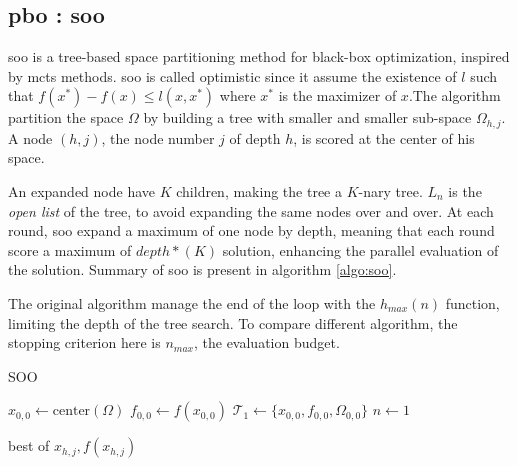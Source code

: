 \subsection{\acrlong{pbo} : \acrfull{soo}}
\label{sec:soo}

\acrshort{soo} \cite{munos_optimistic_2011} is a tree-based space partitioning method for black-box optimization, inspired by \acrfull{mcts} methods. \acrshort{soo} is called optimistic since it assume the existence of $ l$ such that $f(x^*)-f(x) \leq l(x,x^*)$ where $x^*$ is the maximizer of $x$.The algorithm partition the space $\Omega$ by building a tree with smaller and smaller sub-space $\Omega_{h,j}$. A node $(h,j)$, the node number $j$ of depth $h$, is scored at the center of his space. 
    
An expanded node have $K$ children, making the tree a $K$-nary tree. $L_n$ is the \textit{open list} of the tree, to avoid expanding the same nodes over and over. At each round, \acrshort{soo} expand a maximum of one node by depth, meaning that each round score a maximum of $depth*(K)$ solution, enhancing the parallel evaluation of the solution. Summary of \acrshort{soo} is present in algorithm \ref{algo:soo}.

The original algorithm manage the end of the loop with the $h_{max}(n)$ function, limiting the depth of the tree search. To compare different algorithm, the stopping criterion here is $n_{max}$, the evaluation budget. 

\begin{algorithm}[h]
    \caption{SOO \hfill}
    \label{algo:soo}
    $x_{0,0} \gets \text{center}(\Omega)$ \;
    $f_{0,0} \gets f(x_{0,0})$ \;
    $\mathcal{T}_1 \gets \{x_{0,0}, f_{0,0}, \Omega_{0,0}\}$ \;
    $n \gets 1$ \;

    \Return best of $x_{h,j}, f(x_{h,j})$ \;
    \end{algorithm}



